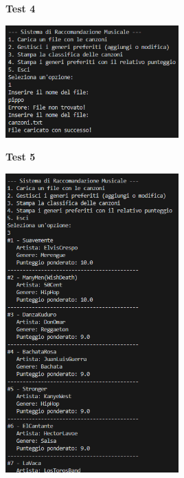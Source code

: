 \documentclass[a4paper,11pt]{article}
\begin{document}
\newpage
\begin{center}
    \textbf{Test 4}
    \par
    \vspace{0.5cm}
    \includegraphics[width=0.5\textwidth]{htest4}
\end{center}
\begin{center}
    \textbf{Test 5}
    \par
    \vspace{0.5cm}
    \includegraphics[width=0.5\textwidth]{htest5}
\end{center}
\end{document}
